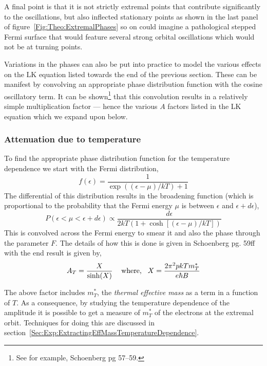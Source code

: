 A final point is that it is not strictly extremal points that contribute significantly to the oscillations, but also inflected stationary points as shown in the last panel of figure~\ref{Fig:Theo:ExtremalPhases} so on could imagine a pathological stepped Fermi surface that would feature several strong orbital oscillations which would not be at turning points.

Variations in the phases can also be put into practice to model the various effects on the \ac{LK} equation listed towards the end of the previous section. These can be manifest by convolving an appropriate phase distribution function with the cosine oscillatory term. It can be shown\footnote{See for example, Schoenberg pg 57--59.\cite{Schoenberg1984}} that this convolution results in a relatively simple multiplication factor --- hence the various $A$ factors listed in the \ac{LK} equation which we expand upon below.

\subsubsection{Attenuation due to temperature}

To find the appropriate phase distribution function for the temperature dependence we start with the Fermi distribution,
\begin{equation}
\label{Eqn:Theo:FermiFunction}
f(\epsilon) = \frac{1}{\exp\left((\epsilon-\mu)/kT\right) + 1}
\end{equation} 
The differential of this distribution results in the broadening function (which is proportional to the probability that the Fermi energy $\mu$ is between $\epsilon$ and $\epsilon + d\epsilon$),
\begin{equation}
  P(\epsilon < \mu < \epsilon + d\epsilon) \propto \frac{d\epsilon}{2kT(1 + \cosh[(\epsilon - \mu)/kT])}
\end{equation}
This is convolved across the Fermi energy to smear it and also the phase through the parameter $F$. The details of how this is done is given in Schoenberg pg. 59ff~\cite{Schoenberg1984} with the end result is given by,
\begin{equation}
\label{Eqn:Theo:TemperatureTerm}
  A_T = \frac{X}{\sinh(X)} \textrm{\hspace{0.3cm} where,\hspace{0.3cm}} X = \frac{2\pi^2pkT m^*_T}{e\hbar B}
\end{equation}

The above factor includes $m^*_T$, the \textit{thermal effective mass} as a term in a function of $T$. As a consequence, by studying the temperature dependence of the amplitude it is possible to get a measure of $m^*_T$ of the electrons at the extremal orbit. Techniques for doing this are discussed in section~\ref{Sec:Exp:ExtractingEffMassTemperatureDependence}.

